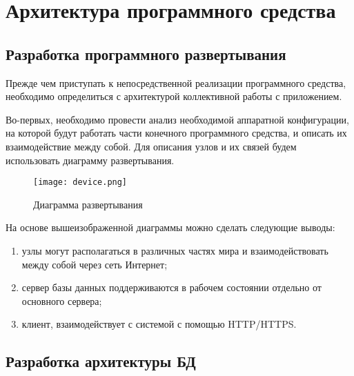 \section{Архитектура программного средства} %
\label{sec:arch_and_mod}

\subsection{Разработка программного развертывания}
\label{sub:arch_and_mod:graphlib}

Прежде чем приступать к непосредственной реализации программного средства, необходимо определиться с архитектурой коллективной работы с приложением.

Во-первых, необходимо провести анализ необходимой аппаратной конфигурации, на которой будут работать части конечного программного средства, и описать их взаимодействие между собой. Для описания узлов и их связей будем использовать диаграмму развертывания.

\begin{figure}[ht]
\centering
  \texttt{[image: device.png]}  
  \caption{Диаграмма развертывания}
  \label{fig:domain:manual_structure:credit_device}
\end{figure}

На основе вышеизображенной диаграммы можно сделать следующие выводы:

\begin{enumerate}
  \item узлы могут располагаться в различных частях мира и взаимодействовать между собой через сеть Интернет;
  \item сервер базы данных поддерживаются в рабочем состоянии отдельно от основного сервера;
  \item клиент, взаимодействует с системой с помощью HTTP/HTTPS.
\end{enumerate}

\subsection{Разработка архитектуры БД }
\label{sub:arch_and_mod:graphlib}

